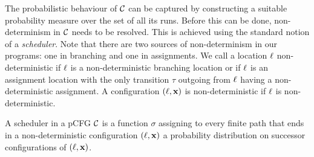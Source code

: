 \smallskip{}
The probabilistic
behaviour of $\mathcal{C}$ can be captured by constructing a suitable
probability measure over the set of all its runs. Before this can be
done, non-determinism in $\mathcal{C}$ needs to be resolved. This is achieved using 
the 
standard notion of a \emph{scheduler}. Note that there are two sources of 
non-determinism in our programs: one in branching and 
one in assignments. We call a location $\ell$ non-deterministic if $\ell$ is a 
non-deterministic branching location or if $\ell$ is an assignment location 
with the only transition $\tau$ outgoing from 
$\ell$ having a non-deterministic assignment. A configuration 
$(\ell,\mathbf{x})$ is non-deterministic if $\ell$ is non-deterministic.

\smallskip
\begin{definition}[Schedulers]
\label{def:schedulers}
A scheduler in a pCFG $\mathcal{C}$ is a function $\sigma$
 assigning 
to every finite path that ends in a non-deterministic configuration 
$(\ell,\mathbf{x})$ a probability distribution on successor configurations of 
$(\ell,\mathbf{x})$.

\end{definition}


